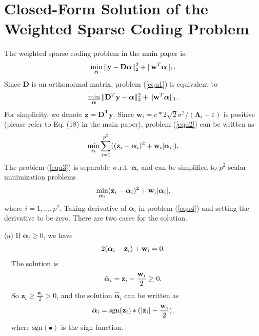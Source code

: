 \documentclass[10pt,onecolumn,letterpaper]{article}
\begin{document}
\section{Closed-Form Solution of the Weighted Sparse Coding Problem}
The weighted sparse coding problem in the main paper is:
\begin{equation}\label{equ1}
\setlength{\abovedisplayskip}{1pt}
\setlength{\belowdisplayskip}{1pt}
\min_{\boldsymbol{\alpha}}\|\mathbf{y}-\mathbf{D}\boldsymbol{\alpha}\|_{2}^{2}+\|\mathbf{w}^{T}\boldsymbol{\alpha}\|_{1}.
\end{equation}
Since $\mathbf{D}$ is an orthonormal matrix, problem (\ref{equ1}) is equivalent to 
\begin{equation}\label{equ2}
\setlength{\abovedisplayskip}{1pt}
\setlength{\belowdisplayskip}{1pt}
\min_{\boldsymbol{\alpha}}\|\mathbf{D}^{T}\mathbf{y}-\boldsymbol{\alpha}\|_{2}^{2}+\|\mathbf{w}^{T}\boldsymbol{\alpha}\|_{1}.
\end{equation}
For simplicity, we denote $\mathbf{z} = \mathbf{D^{T}y}$. Since $\mathbf{w}_{i}=c*2\sqrt{2}\sigma^{2}/(\mathbf{\Lambda}_{i}+\varepsilon)$ is positive (please refer to Eq. (18) in the main paper), problem (\ref{equ2}) can be written as
\begin{equation}\label{equ3}
\setlength{\abovedisplayskip}{0.01pt}
\setlength{\belowdisplayskip}{0.01pt}
\min_{\boldsymbol{\alpha}}\sum_{i=1}^{p^{2}}((\mathbf{z}_{i}-\boldsymbol{\alpha}_{i})^{2}+\mathbf{w}_{i}|\boldsymbol{\alpha}_{i}|).
\end{equation}
The problem (\ref{equ3}) is separable w.r.t. $\boldsymbol{\alpha}_{i}$ and can be simplified to $p^{2}$ scalar minimization problems
\begin{equation}\label{equ4}
\setlength{\abovedisplayskip}{2pt}
\setlength{\belowdisplayskip}{1pt}
\min_{\boldsymbol{\alpha}_{i}}(\mathbf{z}_{i}-\boldsymbol{\alpha}_{i})^{2}+\mathbf{w}_{i}|\boldsymbol{\alpha}_{i}|,
\end{equation}
where $i=1,...,p^{2}$. Taking derivative of $\boldsymbol{\alpha}_{i}$ in problem (\ref{equ4}) and setting the derivative to be zero. There are two cases for the solution.

(a) If $\boldsymbol{\alpha}_{i}\ge 0$, we have
\begin{equation}\label{equ5}
\setlength{\abovedisplayskip}{0.1pt}
\setlength{\belowdisplayskip}{0.11pt}
2(\boldsymbol{\alpha}_{i}-\mathbf{z}_{i})+\mathbf{w}_{i}=0.
\end{equation}
\qquad\ \  The solution is
\begin{equation}\label{equ6}
\setlength{\abovedisplayskip}{0.1pt}
\setlength{\belowdisplayskip}{0.1pt}
\hat{\boldsymbol{\alpha}}_{i}=\mathbf{z}_{i}-\frac{\mathbf{w}_{i}}{2} \ge 0.
\end{equation}
\qquad\ \  So $\mathbf{z}_{i}\ge\frac{\mathbf{w}_{i}}{2}> 0$, and the solution $\hat{\boldsymbol{\alpha}}_{i}$ can be written as
\begin{equation}\label{equ7}
\setlength{\abovedisplayskip}{0.1pt}
\setlength{\belowdisplayskip}{0.1pt}
\hat{\boldsymbol{\alpha}}_{i}=\text{sgn}(\mathbf{z}_{i})*(|\mathbf{z}_{i}|-\frac{\mathbf{w}_{i}}{2}),
\end{equation}
\qquad\ \  where $\text{sgn}(\bullet)$ is the sign function. 
\end{document}
